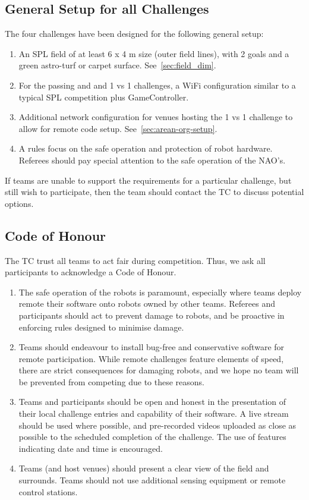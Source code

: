 \subsection{General Setup for all Challenges}

The four challenges have been designed for the following general setup:
\begin{enumerate}
    \item An SPL field of at least 6 x 4 m size (outer field lines), with 2 goals and a green astro-turf or carpet surface. See~\ref{sec:field_dim}.
    \item For the passing and and 1 vs 1 challenges, a WiFi configuration similar to a typical SPL competition plus GameController. 
    \item Additional network configuration for venues hosting the 1 vs 1 challenge to allow for remote code setup. See~\ref{sec:arean-org-setup}.
    \item A rules focus on the safe operation and protection of robot hardware. Referees should pay special attention to the safe operation of the NAO's.
\end{enumerate}

If teams are unable to support the requirements for a particular challenge, but still wish to participate, then the team should contact the TC to discuss potential options.

\subsection{Code of Honour}

The TC trust all teams to act fair during competition. Thus, we ask all participants to acknowledge a Code of Honour.
\begin{enumerate}
    \item The safe operation of the robots is paramount, especially where teams deploy remote their software onto robots owned by other teams. Referees and participants should act to prevent damage to robots, and be proactive in enforcing rules  designed to minimise damage.
    \item Teams should endeavour to install bug-free and conservative software for remote participation. While remote challenges feature elements of speed, there are strict consequences for damaging robots, and we hope no team will be prevented from competing due to these reasons.
    \item Teams and participants should be open and honest in the presentation of their local challenge entries and capability of their software.  A live stream should be used where possible, and pre-recorded videos uploaded as close as possible to the scheduled completion of the challenge. The use of features indicating date and time is encouraged.
    \item Teams (and host venues) should present a clear view of the field and surrounds. Teams should not use additional sensing equipment or remote control stations.
\end{enumerate} 

